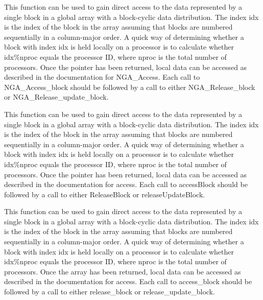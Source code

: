 \documentclass[12pt]{article}
\begin{document}
\local

\begin{cdesc}
This function can be used to gain direct access to the data represented by a
single block in a global array with a block-cyclic data distribution.  The
index idx is the index of the block in the array assuming that blocks are
numbered sequentially in a column-major order. A quick way of determining
whether a block with index idx is held locally on a processor is to calculate
whether idx\%nproc equals the processor ID, where nproc is the total number
of processors. Once the pointer has been returned, local data can be accessed as
described in the documentation for NGA_Access. Each call to NGA_Access_block
should be followed by a call to either NGA_Release_block or
NGA_Release_update_block.
\end{cdesc}

\begin{cxxdesc}
This function can be used to gain direct access to the data represented by a
single block in a global array with a block-cyclic data distribution.  The
index idx is the index of the block in the array assuming that blocks are
numbered sequentially in a column-major order. A quick way of determining
whether a block with index idx is held locally on a processor is to calculate
whether idx\%nproc equals the processor ID, where nproc is the total number
of processors. Once the pointer has been returned, local data can be accessed as
described in the documentation for access. Each call to accessBlock
should be followed by a call to either ReleaseBlock or
releaseUpdateBlock.
\end{cxxdesc}

\begin{pydesc}
This function can be used to gain direct access to the data represented by a
single block in a global array with a block-cyclic data distribution.  The
index idx is the index of the block in the array assuming that blocks are
numbered sequentially in a column-major order. A quick way of determining
whether a block with index idx is held locally on a processor is to calculate
whether idx\%nproc equals the processor ID, where nproc is the total number
of processors. Once the array has been returned, local data can be accessed as
described in the documentation for access. Each call to access_block
should be followed by a call to either release_block or
release_update_block.
\end{pydesc}
\end{document}
